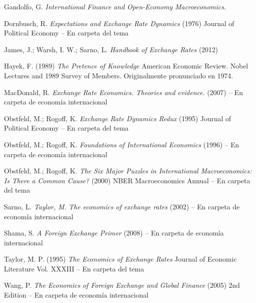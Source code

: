 \documentclass{nuevotema}
\begin{document}
Gandolfo, G. \textit{International Finance and Open-Economy Macroeconomics}. 

Dornbusch, R. \textit{Expectations and Exchange Rate Dynamics} (1976) Journal of Political Economy -- En carpeta del tema


James, J.; Warsh, I. W.; Sarno, L. \textit{Handbook of Exchange Rates} (2012) 

Hayek, F. (1989) \textit{The Pretence of Knowledge} American Economic Review. Nobel Lectures and 1989 Survey of Members. Originalmente pronunciado en 1974.

MacDonald, R. \textit{Exchange Rate Economics. Theories and evidence.} (2007) -- En carpeta de economía internacional

Obstfeld, M.; Rogoff, K. \textit{Exchange Rate Dynamics Redux} (1995) Journal of Political Economy -- En carpeta del tema

Obstfeld, M.; Rogoff, K. \textit{Foundations of International Economics} (1996) -- En carpeta de economía internacional

Obstfeld, M.; Rogoff, K. \textit{The Six Major Puzzles in International Macroeconomics: Is There a Common Cause?} (2000) NBER Macroeconomics Annual -- En carpeta del tema

Sarno, L. \textit{Taylor, M.} \textit{The economics of exchange rates} (2002) -- En carpeta de economía internacional

Shama, S. \textit{A Foreign Exchange Primer} (2008) -- En carpeta de economía internacional

Taylor, M. P. (1995) \textit{The Economics of Exchange Rates} Journal of Economic Literature Vol. XXXIII -- En carpeta del tema

Wang, P. \textit{The Economics of Foreign Exchange and Global Finance} (2005) 2nd Edition -- En carpeta de economía internacional
\end{document}
